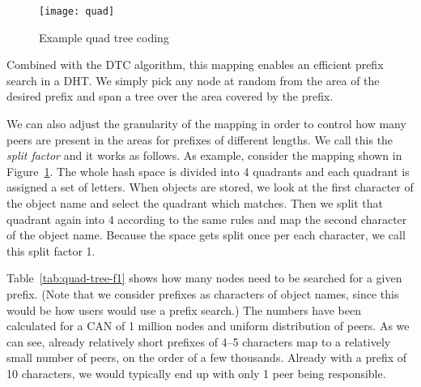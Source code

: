 \documentclass[fleqn,12pt,twoside]{article}
\begin{document}
\begin{figure}[!tb]
  \centering
  \texttt{[image: quad]}
  \caption{Example quad tree coding}
  \label{fig:quad}
\end{figure}


Combined with the DTC algorithm, this mapping enables an efficient
prefix search in a DHT. We simply pick any node at random from the
area of the desired prefix and span a tree over the area covered by
the prefix.

We can also adjust the granularity of the mapping in order to control
how many peers are present in the areas for prefixes of different
lengths. We call this the \emph{split factor} and it works as follows.
As example, consider the mapping shown in Figure~\ref{fig:quad}. The
whole hash space is divided into 4 quadrants and each quadrant is
assigned a set of letters. When objects are stored, we look at the
first character of the object name and select the quadrant which
matches. Then we split that quadrant again into 4 according to the
same rules and map the second character of the object name. Because
the space gets split once per each character, we call this split
factor 1.

Table~\ref{tab:quad-tree-f1} shows how many nodes need to be searched
for a given prefix. (Note that we consider prefixes as characters of
object names, since this would be how users would use a prefix
search.) The numbers have been calculated for a CAN of 1 million nodes
and uniform distribution of peers. As we can see, already relatively
short prefixes of 4--5 characters map to a relatively small number of
peers, on the order of a few thousands. Already with a prefix of 10
characters, we would typically end up with only 1 peer being
responsible. 
\end{document}
